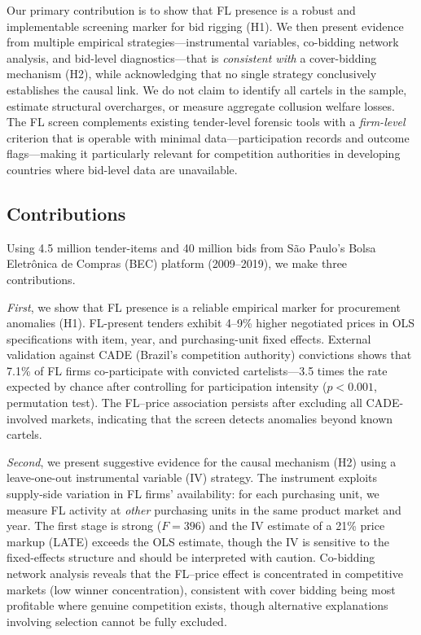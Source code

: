 \noindent Our primary contribution is to show that FL presence is a %
robust and implementable screening marker for bid rigging (H1). We then
present evidence from multiple empirical strategies---instrumental
variables, co-bidding network analysis, and bid-level
diagnostics---that is \emph{consistent with} a cover-bidding
mechanism (H2), while acknowledging that no single strategy
conclusively establishes the causal link. We do not claim to identify
all cartels in the sample, estimate structural overcharges, or measure
aggregate collusion welfare losses. The FL screen complements existing
tender-level forensic tools \citep{imhof2019detecting,
wallimann2023wild} with a \emph{firm-level} criterion that is
operable with minimal data---participation records and outcome
flags---making it particularly relevant for competition authorities in
developing countries where bid-level data are unavailable.

\subsection{Contributions}

Using 4.5 million tender-items and 40 million bids from S\~ao Paulo's
Bolsa Eletr\^onica de Compras (BEC) platform (2009--2019), we make three
contributions.

\emph{First}, we show that FL presence is a reliable empirical marker
for procurement anomalies (H1). FL-present tenders exhibit 4--9\%
higher negotiated prices in OLS specifications with item, year, and
purchasing-unit fixed effects. External validation against CADE
(Brazil's competition authority) convictions shows that 7.1\% of FL
firms co-participate with convicted cartelists---3.5 times the rate
expected by chance after controlling for participation intensity
($p < 0.001$, permutation test). The FL--price association persists
after excluding all CADE-involved markets, indicating that the screen
detects anomalies beyond known cartels.

\emph{Second}, we present suggestive evidence for the causal mechanism %
(H2) using a leave-one-out instrumental variable (IV) strategy. The
instrument exploits supply-side variation in FL firms' availability: for
each purchasing unit, we measure FL activity at \emph{other} purchasing
units in the same product market and year. The first stage is strong
($F = 396$) and the IV estimate of a 21\% price markup (LATE) exceeds
the OLS estimate, though the IV is sensitive to the fixed-effects
structure and should be interpreted with caution. Co-bidding
network analysis reveals that the FL--price effect is concentrated in
competitive markets (low winner concentration), consistent with cover
bidding being most profitable where genuine competition exists, though
alternative explanations involving selection cannot be fully excluded.


